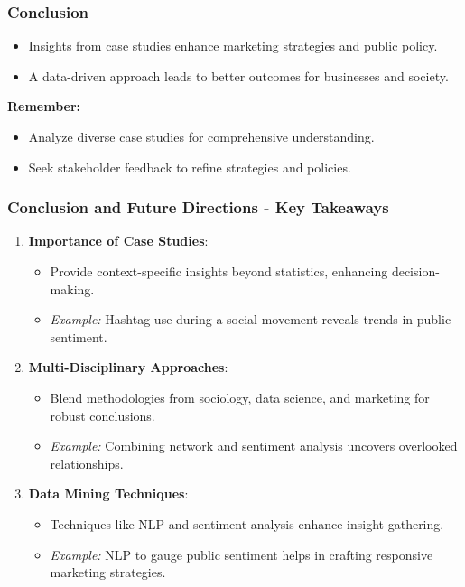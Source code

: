 \documentclass{beamer}
\begin{document}
\begin{frame}[fragile]
    \frametitle{Conclusion}
    \begin{itemize}
        \item Insights from case studies enhance marketing strategies and public policy.
        \item A data-driven approach leads to better outcomes for businesses and society.
    \end{itemize}
    
    \textbf{Remember:}
    \begin{itemize}
        \item Analyze diverse case studies for comprehensive understanding.
        \item Seek stakeholder feedback to refine strategies and policies.
    \end{itemize}
\end{frame}

\begin{frame}[fragile]
    \frametitle{Conclusion and Future Directions - Key Takeaways}
    
    \begin{enumerate}
        \item \textbf{Importance of Case Studies}:
        \begin{itemize}
            \item Provide context-specific insights beyond statistics, enhancing decision-making.
            \item \textit{Example:} Hashtag use during a social movement reveals trends in public sentiment.
        \end{itemize}
        
        \item \textbf{Multi-Disciplinary Approaches}:
        \begin{itemize}
            \item Blend methodologies from sociology, data science, and marketing for robust conclusions.
            \item \textit{Example:} Combining network and sentiment analysis uncovers overlooked relationships.
        \end{itemize}
        
        \item \textbf{Data Mining Techniques}:
        \begin{itemize}
            \item Techniques like NLP and sentiment analysis enhance insight gathering.
            \item \textit{Example:} NLP to gauge public sentiment helps in crafting responsive marketing strategies.
        \end{itemize}
    \end{enumerate}
\end{frame}
\end{document}
